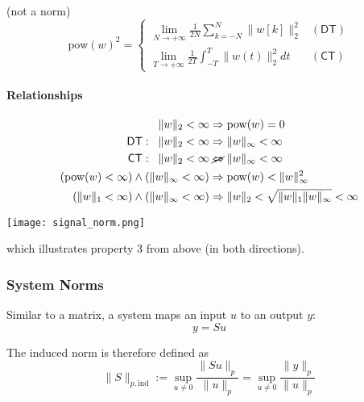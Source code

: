  (not a norm)
\noindent\begin{equation*}
    \mathrm{pow}{(w)}^2=
    \begin{cases}
        \lim\limits_{N\to+\infty}\frac{1}{2N}\sum\limits_{k=-N}^N\|w[k]\|_2^2 & \mathsf{(DT)} \\
        \lim\limits_{T\to+\infty}\frac{1}{2T}\int_{-T}^T\|w(t)\|_2^2 dt       & \mathsf{(CT)}
    \end{cases}
\end{equation*}

\paragraph{Relationships}
\noindent\begin{align*}
    \|w\|_2<\infty                                         & \Rightarrow \mathrm{pow}{(w)}=0                         \\
    \mathsf{DT}:\;\;\|w\|_2<\infty                         & \Rightarrow \|w\|_\infty<\infty                         \\
    \mathsf{CT}:\;\;\|w\|_2<\infty                         & \;\cancel{\Leftrightarrow}\; \|w\|_\infty<\infty        \\
    (\mathrm{pow}{(w)}<\infty) \land (\|w\|_\infty<\infty) & \Rightarrow \mathrm{pow}{(w)} < \|w\|_\infty^2          \\
    (\|w\|_1<\infty) \land (\|w\|_\infty<\infty)           & \Rightarrow \|w\|_2<\sqrt{\|w\|_1\|w\|_\infty} < \infty
\end{align*}

\newpar{}

\begin{center}
    \texttt{[image: signal\_norm.png]}
\end{center}
which illustrates property 3 from above (in both directions).

\newpar{}
\subsubsection{System Norms}
Similar to a matrix, a system maps an input $u$ to an output $y$:
\noindent\begin{equation*}
    y=Su
\end{equation*}

The induced norm is therefore defined as
\noindent\begin{equation*}
    \|S\|_{p,\mathrm{ind}}:=\sup_{u\neq0}\frac{\|Su\|_p}{\|u\|_p}=\sup_{u\neq0}\frac{\|y\|_p}{\|u\|_p}
\end{equation*}

